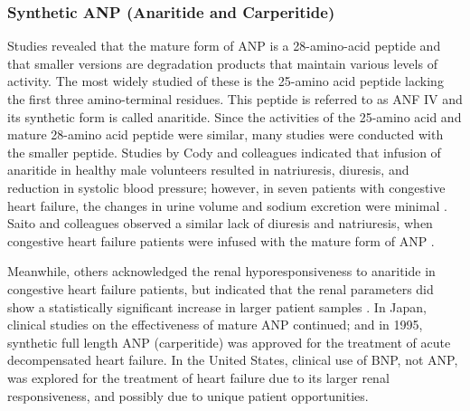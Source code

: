 \documentclass[14pt,a4paper,onecolumn]{extarticle}
\begin{document}
\subsubsection{Synthetic ANP (Anaritide and Carperitide)}
Studies revealed that the mature form of ANP is a 28-amino-acid peptide and that smaller versions are degradation products that maintain various levels of activity. The most widely studied of these is the 25-amino acid peptide lacking the first three amino-terminal residues. This peptide is referred to as ANF IV and its synthetic form is called anaritide.
Since the activities of the 25-amino acid and mature 28-amino acid peptide were similar, many studies were conducted with the smaller peptide. Studies by Cody and colleagues indicated that infusion of anaritide in healthy male volunteers resulted in natriuresis, diuresis, and reduction in systolic blood pressure; however, in seven patients with congestive heart failure, the changes in urine volume and sodium excretion were minimal \citep{Cody1986}. Saito and colleagues observed a similar lack of diuresis and natriuresis, when congestive heart failure patients were infused with the mature form of ANP \citep{Saito1987}.

Meanwhile, others acknowledged the renal hyporesponsiveness to anaritide in congestive heart failure patients, but indicated that the renal parameters did show a statistically significant increase in larger patient samples \citep{Fifer1990}. In Japan, clinical studies on the effectiveness of mature ANP continued; and in 1995, synthetic full length ANP (carperitide) was approved for the treatment of acute decompensated heart failure. In the United States, clinical use of BNP, not ANP, was explored for the treatment of heart failure due to its larger renal responsiveness, and possibly due to unique patient opportunities. %
\end{document}
